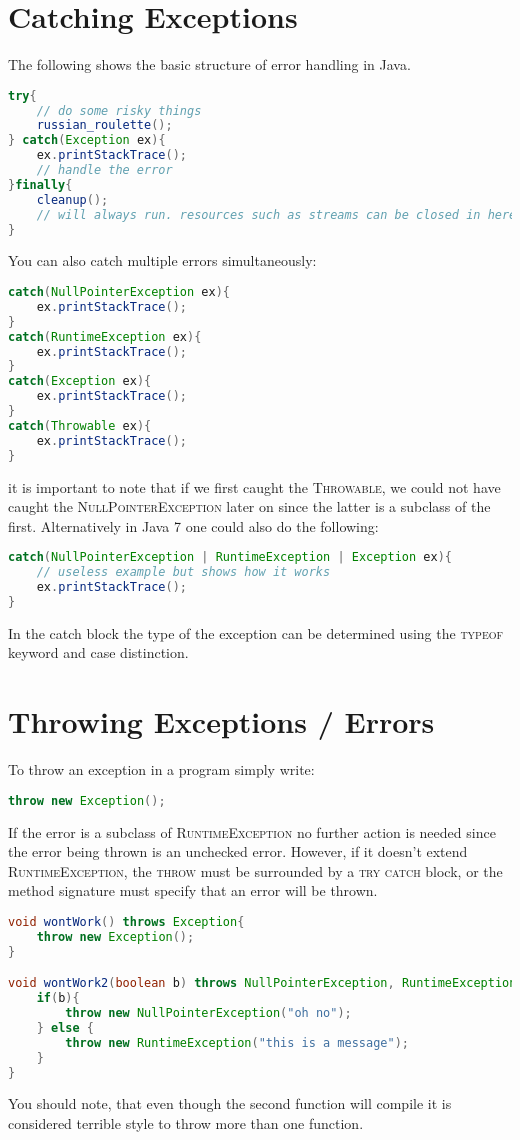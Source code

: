 \documentclass{scrartcl}
\begin{document}
\section{Catching Exceptions}
The following shows the basic structure of error handling in Java.
\begin{lstlisting}[language=java]
try{
    // do some risky things
    russian_roulette();
} catch(Exception ex){
    ex.printStackTrace();
    // handle the error
}finally{
    cleanup();
    // will always run. resources such as streams can be closed in here.
}
\end{lstlisting}

You can also catch multiple errors simultaneously:
\begin{lstlisting}[language=java]
catch(NullPointerException ex){
    ex.printStackTrace();
}
catch(RuntimeException ex){
    ex.printStackTrace();
}
catch(Exception ex){
    ex.printStackTrace();
}
catch(Throwable ex){
    ex.printStackTrace();
}
\end{lstlisting}
it is important to note that if we first caught the \textsc{Throwable}, we could not have caught the \textsc{NullPointerException} later on since the latter is a subclass of the first. Alternatively in Java 7 one could also do the following:
\begin{lstlisting}[language=java]
catch(NullPointerException | RuntimeException | Exception ex){
    // useless example but shows how it works
    ex.printStackTrace();
}
\end{lstlisting}
In the catch block the type of the exception can be determined using the \textsc{typeof} keyword and case distinction.


\section{Throwing Exceptions / Errors}
To throw an exception in a program simply write:
\begin{lstlisting}[language=java]
throw new Exception();
\end{lstlisting}
If the error is a subclass of \textsc{RuntimeException} no further action is needed since the error being thrown is an unchecked error. However, if it doesn't extend \textsc{RuntimeException}, the \textsc{throw} must be surrounded by a \textsc{try catch} block, or the method signature must specify that an error will be thrown. 
\begin{lstlisting}[language=java]
void wontWork() throws Exception{
    throw new Exception();
}

void wontWork2(boolean b) throws NullPointerException, RuntimeException{
    if(b){
        throw new NullPointerException("oh no");
    } else {
        throw new RuntimeException("this is a message");
    }
}
\end{lstlisting}
You should note, that even though the second function will compile it is considered terrible style to throw more than one function.
\end{document}
